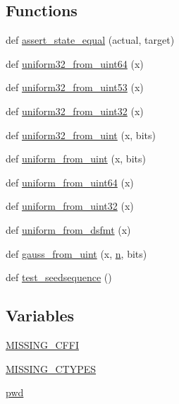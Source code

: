 \subsection*{Functions}
\begin{DoxyCompactItemize}
\item 
def \hyperlink{namespacenumpy_1_1random_1_1tests_1_1test__direct_a2012e1a967d3360c675b160ac79aba28}{assert\+\_\+state\+\_\+equal} (actual, target)
\item 
def \hyperlink{namespacenumpy_1_1random_1_1tests_1_1test__direct_a7ee15f49aaace3e21110cd2bf60e6500}{uniform32\+\_\+from\+\_\+uint64} (x)
\item 
def \hyperlink{namespacenumpy_1_1random_1_1tests_1_1test__direct_ae38c8366c039a44149cc545bcc70340d}{uniform32\+\_\+from\+\_\+uint53} (x)
\item 
def \hyperlink{namespacenumpy_1_1random_1_1tests_1_1test__direct_a1d0690786bc2e2d6f0e609576a69b925}{uniform32\+\_\+from\+\_\+uint32} (x)
\item 
def \hyperlink{namespacenumpy_1_1random_1_1tests_1_1test__direct_a9ea23cd4a1a7208b082a303df8ddc61e}{uniform32\+\_\+from\+\_\+uint} (x, bits)
\item 
def \hyperlink{namespacenumpy_1_1random_1_1tests_1_1test__direct_a8c1d8dc603e2aa5191e7c37ea32a1e1a}{uniform\+\_\+from\+\_\+uint} (x, bits)
\item 
def \hyperlink{namespacenumpy_1_1random_1_1tests_1_1test__direct_a64652f113a8a9514f05607108d523837}{uniform\+\_\+from\+\_\+uint64} (x)
\item 
def \hyperlink{namespacenumpy_1_1random_1_1tests_1_1test__direct_a17f4e51babbce0058b93ce86e8cdc145}{uniform\+\_\+from\+\_\+uint32} (x)
\item 
def \hyperlink{namespacenumpy_1_1random_1_1tests_1_1test__direct_ab5f553fb824ed14d869831113623e23b}{uniform\+\_\+from\+\_\+dsfmt} (x)
\item 
def \hyperlink{namespacenumpy_1_1random_1_1tests_1_1test__direct_a0d66cf47e88586caadff95ce86baaa4e}{gauss\+\_\+from\+\_\+uint} (x, \hyperlink{namespacenumpy_a352663c52853d2754274407d5cae2832}{n}, bits)
\item 
def \hyperlink{namespacenumpy_1_1random_1_1tests_1_1test__direct_a963a3ae7279b0ba2dec768bb31b65e2c}{test\+\_\+seedsequence} ()
\end{DoxyCompactItemize}
\subsection*{Variables}
\begin{DoxyCompactItemize}
\item 
\hyperlink{namespacenumpy_1_1random_1_1tests_1_1test__direct_a33221a9d8eae8d1da34c85b50f64a429}{M\+I\+S\+S\+I\+N\+G\+\_\+\+C\+F\+FI}
\item 
\hyperlink{namespacenumpy_1_1random_1_1tests_1_1test__direct_a131d4758a289f2f3842ec3da4adba557}{M\+I\+S\+S\+I\+N\+G\+\_\+\+C\+T\+Y\+P\+ES}
\item 
\hyperlink{namespacenumpy_1_1random_1_1tests_1_1test__direct_a23911fc58f359e9081da70dd90630b16}{pwd}
\end{DoxyCompactItemize}


